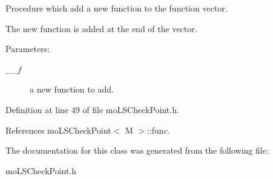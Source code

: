 Procedure which add a new function to the function vector. 

The new function is added at the end of the vector. \begin{Desc}
\item[Parameters:]
\begin{description}
\item[{\em \_\-\_\-f}]a new function to add. \end{description}
\end{Desc}


Definition at line 49 of file moLSCheckPoint.h.

References moLSCheckPoint$<$ M $>$::func.

The documentation for this class was generated from the following file:\begin{CompactItemize}
\item 
moLSCheckPoint.h\end{CompactItemize}
